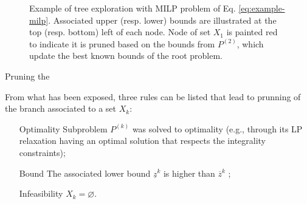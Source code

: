 \begin{figure}[h]
    \centering
    \caption{Example of tree exploration with MILP problem of Eq. \eqref{eq:example-milp}. Associated upper (resp. lower) bounds are illustrated at the top (resp. bottom) left of each node. Node of set $X_1$ is painted red to indicate it is pruned based on the bounds from $P^{(2)}$, which update the best known bounds of the root problem.}
    \label{fig:pruning-example-milp}
\end{figure}

Pruning the 

From what has been exposed, three rules can be listed that lead to prunning of the branch associated to a set $X_k$:
\begin{itemize}
    \item[Optimality] Subproblem $P^{(k)}$ was solved to optimality (e.g., through its LP relaxation having an optimal solution that respects the integrality constraints);
    \item[Bound] The associated lower bound $\underline{z}^{k}$ is higher than $\overline{z}^{k}$ ;
    \item[Infeasibility] $X_k = \varnothing$.
\end{itemize}








